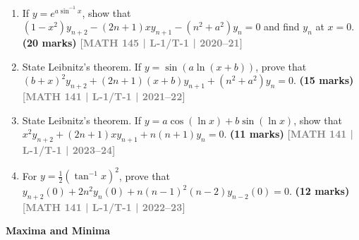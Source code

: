 \documentclass[12pt,a4paper]{article}
\newcommand{\yr}[1]{\hfill\textcolor{gray}{\small\textbf{[#1]}}}
\newcommand{\mk}[1]{\textcolor{orange!70!black}{\small\textbf{(#1 marks)}}}
\newcommand{\subtopic}[2]{%
  \vspace{10pt}
  \noindent\begin{tcolorbox}[colback=#1!8,colframe=#1,boxrule=0.6pt,arc=4pt,
    left=6pt,right=6pt,top=4pt,bottom=4pt]
    \small\bfseries\textcolor{#1}{#2}
  \end{tcolorbox}
  \vspace{2pt}
}
\begin{document}
\begin{enumerate}
\item If $y=e^{a\sin^{-1}x}$, show that $(1-x^{2})y_{n+2}-(2n+1)xy_{n+1}-(n^{2}+a^{2})y_{n}=0$ and find $y_{n}$ at $x=0$.
\mk{20} \yr{MATH 145 | L-1/T-1 | 2020--21}

\item State Leibnitz's theorem. If $y=\sin(a\ln(x+b))$, prove that $(b+x)^{2}y_{n+2}+(2n+1)(x+b)y_{n+1}+(n^{2}+a^{2})y_{n}=0$.
\mk{15} \yr{MATH 141 | L-1/T-1 | 2021--22}

\item State Leibnitz's theorem. If $y=a\cos(\ln x)+b\sin(\ln x)$, show that $x^{2}y_{n+2}+(2n+1)xy_{n+1}+n(n+1)y_{n}=0$.
\mk{11} \yr{MATH 141 | L-1/T-1 | 2023--24}

\item For $y=\tfrac{1}{2}(\tan^{-1}x)^{2}$, prove that $y_{n+2}(0)+2n^{2}y_{n}(0)+n(n-1)^{2}(n-2)y_{n-2}(0)=0$.
\mk{12} \yr{MATH 141 | L-1/T-1 | 2022--23}



\end{enumerate}

\subtopic{cA}{Maxima and Minima}
\label{sub:s1-maxmin}
\end{document}
